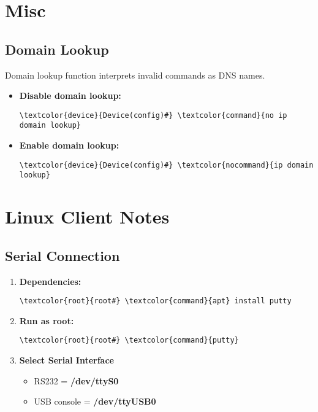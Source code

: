 \documentclass[10pt, a4paper, onecolumn, oneside, titlepage, openany]{book}
\begin{document}
\chapter{Misc}
\section{Domain Lookup}
Domain lookup function interprets invalid commands as DNS names.
\begin{itemize}
    \item \textbf{Disable domain lookup:}
\begin{Verbatim}[commandchars=\\\{\}]
\textcolor{device}{Device(config)#} \textcolor{command}{no ip domain lookup}
\end{Verbatim}
    \item \textbf{Enable domain lookup:}
\begin{Verbatim}[commandchars=\\\{\}]
\textcolor{device}{Device(config)#} \textcolor{nocommand}{ip domain lookup}
\end{Verbatim}
\end{itemize}

\chapter{Linux Client Notes}
\section{Serial Connection}
\begin{enumerate}
    \item \textbf{Dependencies:}
\begin{Verbatim}[commandchars=\\\{\}]
\textcolor{root}{root#} \textcolor{command}{apt} install putty
\end{Verbatim}
    \item \textbf{Run as root:}
\begin{Verbatim}[commandchars=\\\{\}]
\textcolor{root}{root#} \textcolor{command}{putty}
\end{Verbatim}
    \item \textbf{Select Serial Interface}
\begin{itemize}
    \item RS232 = \textbf{/dev/ttyS0}
    \item USB console = \textbf{/dev/ttyUSB0}
\end{itemize}
\end{enumerate}
\end{document}
